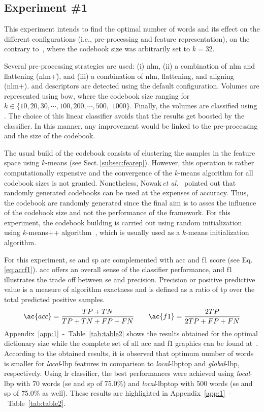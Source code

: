 \subsection{Experiment \#1}\label{subsec:exp1}
This experiment intends to find the optimal number of words and its effect on the different configurations (i.e., pre-processing and feature representation), on the contrary to~\cite{Lemaintre2015miccaiOCT}, where the codebook size was arbitrarily set to $k = 32$.

Several pre-processing strategies are used: (i) \ac{nlm}, (ii) a combination of \ac{nlm} and flattening (\ac{nlm}+\f), and (iii) a combination of \ac{nlm}, flattening, and aligning (\ac{nlm}+\fal).
\lbp and \lbptop descriptors are detected using the default configuration.
Volumes are represented using \ac{bow}, where the codebook size ranging for $k\in \{10, 20, 30, \cdots, 100, 200, \cdots, 500,$ $1000\}$.
Finally, the volumes are classified using \lr.
The choice of this linear classifier avoids that the results get boosted by the classifier.
In this manner, any improvement would be linked to the pre-processing and the size of the codebook.

The usual build of the codebook consists of clustering the samples in the feature space using $k$-means (see Sect.\,\ref{subsec:fearep}).
However, this operation is rather computationally expensive and the convergence of the $k$-means algorithm for all codebook sizes is not granted.
Nonetheless, Nowak\,\textit{et al.}~\cite{nowak2006sampling} pointed out that randomly generated codebooks can be used at the expenses of accuracy.
Thus, the codebook are randomly generated since the final aim is to asses the influence of the codebook size and not the performance of the framework.
For this experiment, the codebook building is carried out using random initialization using $k$-means++ algorithm~\cite{arthur2007k}, which is usually used as a $k$-means initialization algorithm.

For this experiment, \ac{se} and \ac{sp} are complemented with \ac{acc} and \ac{f1} score (see Eq.\,\eqref{eq:accf1}).
\ac{acc} offers an overall sense of the classifier performance, and \ac{f1} illustrates the trade off between \ac{se} and precision.
Precision or positive predictive value is a measure of algorithm exactness and is defined as a ratio of \ac{tp} over the total predicted positive samples.
\begin{align}
\ac{acc} = \frac{TP+TN}{TP+TN+FP+FN} \qquad \ac{f1} = \frac{2TP}{2TP +FP+FN}
\label{eq:accf1}
\end{align}
Appendix~\ref{app:1}~-~Table~\ref{tab:table2} shows the results obtained for the optimal dictionary size while the complete set of all \ac{acc} and \ac{f1} graphics can be found at~\cite{Lemaitre2015}.
According to the obtained results, it is observed that optimum number of words is smaller for \emph{local}-\ac{lbp} features in comparison to \emph{local}-\ac{lbptop} and \emph{global}-\ac{lbp}, respectively.
Using \ac{lr} classifier, the best performances were achieved using \emph{local}-\ac{lbp} with 70 words (\ac{se} and \ac{sp} of 75.0\%) and \emph{local}-\ac{lbptop} with 500 words (\ac{se} and \ac{sp} of 75.0\% as well).
These results are highlighted in Appendix~\ref{app:1}~-~Table~\ref{tab:table2}.